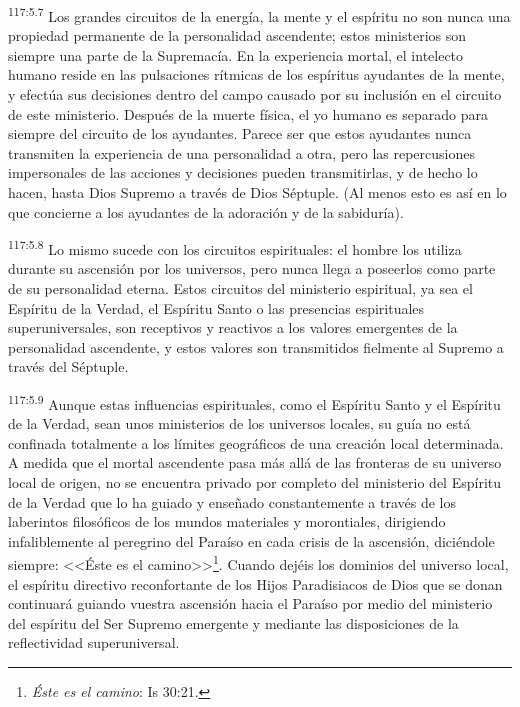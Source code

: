 \par
\textsuperscript{117:5.7} Los grandes circuitos de la energía, la mente y el espíritu no son nunca una propiedad permanente de la personalidad ascendente; estos ministerios son siempre una parte de la Supremacía. En la experiencia mortal, el intelecto humano reside en las pulsaciones rítmicas de los espíritus ayudantes de la mente, y efectúa sus decisiones dentro del campo causado por su inclusión en el circuito de este ministerio. Después de la muerte física, el yo humano es separado para siempre del circuito de los ayudantes. Parece ser que estos ayudantes nunca transmiten la experiencia de una personalidad a otra, pero las repercusiones impersonales de las acciones y decisiones pueden transmitirlas, y de hecho lo hacen, hasta Dios Supremo a través de Dios Séptuple. (Al menos esto es así en lo que concierne a los ayudantes de la adoración y de la sabiduría).

\par
\textsuperscript{117:5.8} Lo mismo sucede con los circuitos espirituales: el hombre los utiliza durante su ascensión por los universos, pero nunca llega a poseerlos como parte de su personalidad eterna. Estos circuitos del ministerio espiritual, ya sea el Espíritu de la Verdad, el Espíritu Santo o las presencias espirituales superuniversales, son receptivos y reactivos a los valores emergentes de la personalidad ascendente, y estos valores son transmitidos fielmente al Supremo a través del Séptuple.

\par
\textsuperscript{117:5.9} Aunque estas influencias espirituales, como el Espíritu Santo y el Espíritu de la Verdad, sean unos ministerios de los universos locales, su guía no está confinada totalmente a los límites geográficos de una creación local determinada. A medida que el mortal ascendente pasa más allá de las fronteras de su universo local de origen, no se encuentra privado por completo del ministerio del Espíritu de la Verdad que lo ha guiado y enseñado constantemente a través de los laberintos filosóficos de los mundos materiales y morontiales, dirigiendo infaliblemente al peregrino del Paraíso en cada crisis de la ascensión, diciéndole siempre: <<Éste es el camino>>\footnote{\textit{Éste es el camino}: Is 30:21.}. Cuando dejéis los dominios del universo local, el espíritu directivo reconfortante de los Hijos Paradisiacos de Dios que se donan continuará guiando vuestra ascensión hacia el Paraíso por medio del ministerio del espíritu del Ser Supremo emergente y mediante las disposiciones de la reflectividad superuniversal.

